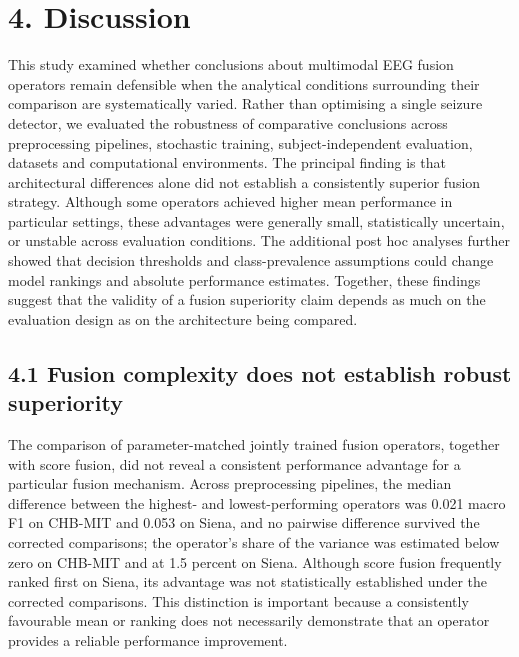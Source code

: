 \documentclass[11pt,a4paper]{article}
\begin{document}
\section{4. Discussion}\label{discussion}

This study examined whether conclusions about multimodal EEG fusion operators remain
defensible when the analytical conditions surrounding their comparison are
systematically varied. Rather than optimising a single seizure detector, we evaluated the
robustness of comparative conclusions across preprocessing pipelines, stochastic
training, subject-independent evaluation, datasets and computational environments. The
principal finding is that architectural differences alone did not establish a
consistently superior fusion strategy. Although some operators achieved higher mean
performance in particular settings, these advantages were generally small, statistically
uncertain, or unstable across evaluation conditions. The additional post hoc analyses
further showed that decision thresholds and class-prevalence assumptions could change
model rankings and absolute performance estimates. Together, these findings suggest that
the validity of a fusion superiority claim depends as much on the evaluation design as on
the architecture being compared.

\subsection{4.1 Fusion complexity does not establish robust superiority}\label{fusion-complexity-does-not-establish-robust-superiority}

The comparison of parameter-matched jointly trained fusion operators, together with
score fusion, did not reveal a consistent performance advantage for a particular fusion
mechanism. Across preprocessing pipelines, the median difference between the highest-
and lowest-performing operators was 0.021 macro F1 on CHB-MIT and 0.053 on Siena, and no
pairwise difference survived the corrected comparisons; the operator's share of the
variance was estimated below zero on CHB-MIT and at 1.5 percent on Siena. Although score
fusion frequently ranked first on Siena, its advantage was not statistically established
under the corrected comparisons. This distinction is important because a consistently
favourable mean or ranking does not necessarily demonstrate that an operator provides a
reliable performance improvement.
\end{document}
